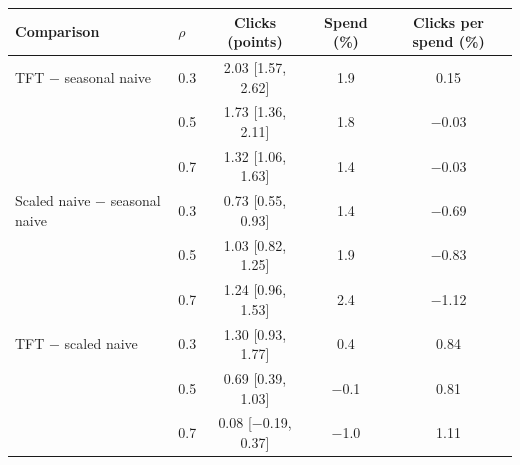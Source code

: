 \begin{tabular}{llccc}
\toprule
Comparison & $\rho$ & Clicks (points) & Spend (\%) & Clicks per spend (\%) \\
\midrule
TFT $-$ seasonal naive & 0.3 & 2.03 [1.57, 2.62] & 1.9 & 0.15 \\
 & 0.5 & 1.73 [1.36, 2.11] & 1.8 & $-$0.03 \\
 & 0.7 & 1.32 [1.06, 1.63] & 1.4 & $-$0.03 \\
\addlinespace[2pt]
Scaled naive $-$ seasonal naive & 0.3 & 0.73 [0.55, 0.93] & 1.4 & $-$0.69 \\
 & 0.5 & 1.03 [0.82, 1.25] & 1.9 & $-$0.83 \\
 & 0.7 & 1.24 [0.96, 1.53] & 2.4 & $-$1.12 \\
\addlinespace[2pt]
TFT $-$ scaled naive & 0.3 & 1.30 [0.93, 1.77] & 0.4 & 0.84 \\
 & 0.5 & 0.69 [0.39, 1.03] & $-$0.1 & 0.81 \\
 & 0.7 & 0.08 [$-$0.19, 0.37] & $-$1.0 & 1.11 \\
\bottomrule
\end{tabular}

